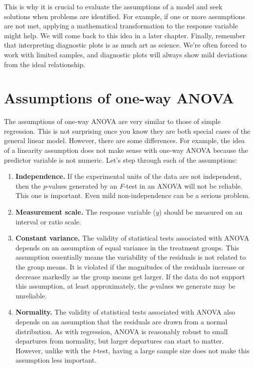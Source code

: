 \documentclass[
]{book}
\begin{document}
This is why it is crucial to evaluate the assumptions of a model and seek solutions when problems are identified. For example, if one or more assumptions are not met, applying a mathematical transformation to the response variable might help. We will come back to this idea in a later chapter. Finally, remember that interpreting diagnostic plots is as much art as science. We're often forced to work with limited samples, and diagnostic plots will always show mild deviations from the ideal relationship.

\hypertarget{assumptions-of-one-way-anova}{%
\section{Assumptions of one-way ANOVA}\label{assumptions-of-one-way-anova}}

The assumptions of one-way ANOVA are very similar to those of simple regression. This is not surprising once you know they are both special cases of the general linear model. However, there are some differences. For example, the idea of a linearity assumption does not make sense with one-way ANOVA because the predictor variable is not numeric. Let's step through each of the assumptions:

\begin{enumerate}
\def\labelenumi{\arabic{enumi}.}
\item
  \textbf{Independence.} If the experimental units of the data are not independent, then the \emph{p}-values generated by an \emph{F}-test in an ANOVA will not be reliable. This one is important. Even mild non-independence can be a serious problem.
\item
  \textbf{Measurement scale.} The response variable (\(y\)) should be measured on an interval or ratio scale.
\item
  \textbf{Constant variance.} The validity of statistical tests associated with ANOVA depends on an assumption of equal variance in the treatment groups. This assumption essentially means the variability of the residuals is not related to the group means. It is violated if the magnitudes of the residuals increase or decrease markedly as the group means get larger. If the data do not support this assumption, at least approximately, the \emph{p}-values we generate may be unreliable.
\item
  \textbf{Normality.} The validity of statistical tests associated with ANOVA also depends on an assumption that the residuals are drawn from a normal distribution. As with regression, ANOVA is reasonably robust to small departures from normality, but larger departures can start to matter. However, unlike with the \emph{t}-test, having a large sample size does not make this assumption less important.
\end{enumerate}
\end{document}
